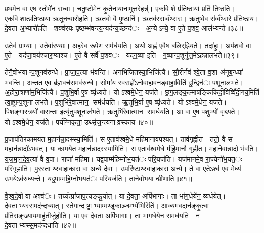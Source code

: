 
प्र॒थ॒मेन॒ वा ए॒ष स्तोमे॑न रा॒ध्वा। च॒तु॒ष्टो॒मेन॑ कृ॒तेनाया॑ना॒मुत्त॒रेहन्न्॑। ए॒क॒वि॒शे प्र॑ति॒ष्ठायां॒ प्रति॑ तिष्ठति। ए॒क॒वि॒शात्प्र॑ति॒ष्ठाया॑ ऋ॒तून॒न्वारो॑हति। ऋ॒तवो॒ वै पृ॒ष्ठानि॑। ऋ॒तव॑स्सव्वँथ्स॒रः। ऋ॒तुष्वे॒व स॑व्वँथ्स॒रे प्र॑ति॒ष्ठाय॑। दे॒वता॑ अ॒भ्यारो॑हति। शक्व॑रयः पृ॒ष्ठम्भ॑वन्त्य॒न्यद॑न्य॒च्छन्द॑ः। अ॒न्येऽन्ये॒ वा ए॒ते प॒शव॒ आल॑भ्यन्ते॥३८॥

उ॒तेव॑ ग्रा॒म्याः। उ॒तेवा॑र॒ण्याः। अह॑रे॒व रू॒पेण॒ सम॑र्धयति। अथो॒ अह्न॑ ए॒वैष ब॒लिर्‌ह्रि॑यते। तदा॑हुः। अप॑शवो॒ वा ए॒ते। यद॑जा॒वय॑श्चार॒ण्याश्च॑। ए॒ते वै सर्वे॑ प॒शव॑ः। यद्ग॒व्या इति॑। ग॒व्यान्प॒शूनु॑त्त॒मेऽह॒न्नाल॑भते॥३९॥

तेनै॒वोभयान्प॒शूनव॑रुन्धे। प्रा॒जा॒प॒त्या भ॑वन्ति। अन॑भिजितस्या॒भिजि॑त्यै। सौ॒रीर्नव॑ श्वे॒ता व॒शा अ॑नूब॒न्ध्या॑ भवन्ति। अ॒न्त॒त ए॒व ब्र॑ह्मवर्च॒समव॑रुन्धे। सोमा॑य स्व॒राज्ञे॑ऽनोवा॒हाव॑न॒ड्वाहा॒विति॑ द्व॒न्द्विन॑ः प॒शूनाल॑भते। अ॒हो॒रा॒त्राणा॑म॒भिजि॑त्यै। प॒शुभि॒र्वा ए॒ष व्यृ॑ध्यते। योऽश्वमे॒धेन॒ यज॑ते। छ॒ग॒लङ्क॒ल्माष॑ङ्किकिदी॒विव्विँ॑दी॒गय॒मिति॑ त्वा॒ष्ट्रान्प॒शूना ल॑भते। प॒शुभि॑रे॒वात्मान॒ सम॑र्धयति। ऋ॒तुभि॒र्वा ए॒ष व्यृ॑ध्यते। योऽश्वमे॒धेन॒ यज॑ते। पि॒शङ्गा॒स्त्रयो॑ वास॒न्ता इत्यृ॑तुप॒शूनाल॑भते। ऋ॒तुभि॑रे॒वात्मान॒ सम॑र्धयति। आ वा ए॒ष प॒शुभ्यो॑ वृश्च्यते। योऽश्वमे॒धेन॒ यज॑ते। पर्य॑ग्निकृता॒ उथ्सृ॑ज॒न्त्यनाव्रस्काय॥४०॥


प्र॒जाप॑तिरकामयत म॒हान॑न्ना॒दस्स्या॒मिति॑। स ए॒ताव॑श्वमे॒धे म॑हि॒माना॑वपश्यत्। ताव॑गृह्णीत। ततो॒ वै स म॒हान॑न्ना॒दो॑ऽभवत्। यः का॒मये॑त म॒हान॑न्ना॒दस्स्या॒मिति॑। स ए॒ताव॑श्वमे॒धे म॑हि॒मानौ॑ गृह्णीत। म॒हाने॒वान्ना॒दो भ॑वति। य॒ज॒मा॒न॒दे॒व॒त्या॑ वै व॒पा। राजा॑ महि॒मा। यद्व॒पाम्म॑हि॒म्नोभ॒यत॑ः परि॒यज॑ति। यज॑मानमे॒व रा॒ज्येनो॑भ॒यत॒ः परि॑गृह्णाति। पु॒रस्ताथ्स्वाहाकारा॒ वा अ॒न्ये दे॒वाः। उ॒परि॑ष्टाथ्स्वाहाकारा अ॒न्ये। ते वा ए॒तेऽश्व॑ ए॒व मेध्य॑ उ॒भयेऽव॑रुध्यन्ते। यद्व॒पाम्म॑हि॒म्नोभ॒यत॑ः परि॒यज॑ति। ताने॒वोभयान्प्रीणाति॥४१॥


वै॒श्व॒दे॒वो वा अश्व॑ः। तय्यँत्प्रा॑जाप॒त्यङ्कु॒र्यात्। या दे॒वता॒ अपि॑भागाः। ता भा॑ग॒धेये॑न॒ व्य॑र्धयेत्। दे॒वताभ्यस्स॒मद॑न्दध्यात्। स्ते॒गान्दष्ट्राभ्याम्म॒ण्डूका॒ञ्जम्भ्ये॑भि॒रिति॑। आज्य॑मव॒दान॑ङ्कृ॒त्वा प्र॑तिस॒ङ्ख्याय॒माहु॑तीर्जुहोति। या ए॒व दे॒वता॒ अपि॑भागाः। ता भा॑ग॒धेये॑न॒ सम॑र्धयति। न दे॒वताभ्यस्स॒मद॑न्दधाति॥४२॥


